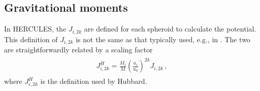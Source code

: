 \documentclass[11pt, oneside]{article}   	%
\begin{document}
\subsection{Gravitational moments}
\label{HUG:sec:Js}
In HERCULES, the $J_{i,2k}$ are defined for each spheroid to calculate the potential.
This definition of $J_{i,2k}$ is not the same as that typically used, e.g., in \cite{Hubbard2013}. 
The two are straightforwardly related by a scaling factor
%
\begin{align}
\begin{aligned}
J_{i,2k}^H  = \frac{M_i}{M} \left ( \frac{a_i}{a_0} \right )^{2k} J_{i,2k} \,,
\end{aligned}
\end{align}
%
where $J_{i,2k}^H$ is the definition used by Hubbard.
\end{document}
